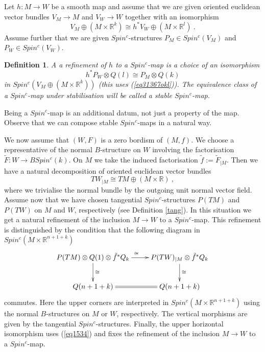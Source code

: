 \documentclass[12pt]{article}
\newtheorem{ddd}[theorem]{Definition}
\newcommand{\R}{{\mathbb{R}}}
\begin{document}
Let $h:M\to W$ be a smooth map and assume that we are given oriented euclidean vector bundles
$V_{M}\to M$ and $V_{W}\to W$ together with an isomorphism
\begin{equation}\label{eq31367okl}
V_{M}\oplus (M\times \R^{k})\cong h^{*}V_{W}\oplus (M\times \R^{l})\ .\end{equation}
Assume further that we are given $Spin^{c}$-structures
$P_{M}\in Spin^{c}(V_{M})$ and $P_{W}\in Spin^{c}(V_{W})$.
\begin{ddd}
A   a refinement of $h$ to a $Spin^{c}$-map is  a choice of an isomorphism
\begin{equation}\label{eq31367okll} h^{*}P_{W}\otimes Q(l)\cong P_{M}\otimes Q(k)\end{equation} in
$Spin^{c}(V_{M}\oplus (M\times \R^{k}))$ (this uses (\ref{eq31367okl})). 
The equivalence class of a $Spin^{c}$-map under stabilisation will be called a stable $Spin^{c}$-map.
 \end{ddd} 
Being a $Spin^{c}$-map is an additional datum, not just a property of the map. 
Observe that we can compose stable $Spin^{c}$-maps in a natural way.

We now assume that $(W,F)$ is a zero bordism of $(M,f)$. 
We choose a representative of the normal $B$-structure on $W$ involving the factorisation
$\tilde F:W\to BSpin^{c}(k)$. On $M$ we take the induced factorisation $\tilde f:=\tilde F_{|M}$.
Then we have a natural   decomposition of oriented euclidean vector bundles
\begin{equation}\label{eq1534}TW_{|M}\cong TM\oplus (M\times \R)\ ,\end{equation} where we trivialise the 
normal bundle by the outgoing unit normal vector field. Assume now that we have chosen tangential $Spin^{c}$-structures $P(TM)$ and $P(TW)$  on $M$ and $W$, respectively (see Definition \ref{tang}).  
In this situation we get a  natural refinement of the inclusion
$M\to W$ to a $Spin^{c}$-map. This refinement is distinguished by the condition that the following diagram in
$Spin^{c}(M\times \R^{n+1+k})$ 
$$\xymatrix{P(TM)\otimes Q(1)\otimes \tilde f^{*}Q_{k}\ar[r]^{\cong}\ar[d]^{\cong}&P(TW)_{|M}\otimes  \tilde f^{*}Q_{k}\ar[d]^{\cong}\\
Q(n+1+k)\ar@{=}[r]&Q(n+1+k)}$$
commutes. Here the upper corners are interpreted in 
$Spin^{c}(M\times \R^{n+1+k})$ using the   normal $B$-structures on $M$ or $W$, respectively. The vertical morphisms are given by the tangential   $Spin^{c}$-structures. Finally, the upper horizontal isomorphism uses  (\ref{eq1534}) and fixes the refinement of the inclusion $M\to W$ to a $Spin^{c}$-map.
\end{document}
